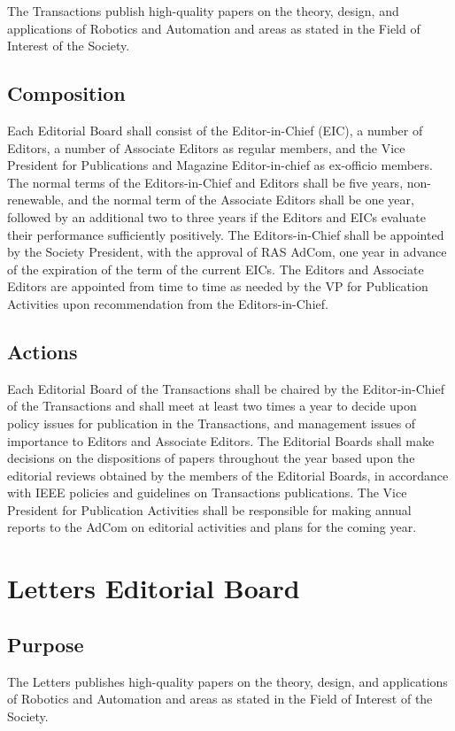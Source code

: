 \documentclass[10pt]{article}
\begin{document}
The Transactions publish high-quality papers on the theory, design, and applications of Robotics and Automation and areas as stated in the Field of Interest of the Society.

\subsection{Composition}
\label{TEB:Composition}
Each Editorial Board shall consist of the Editor-in-Chief (EIC), a number of Editors, a number of Associate Editors as regular members, and the Vice President for Publications and Magazine Editor-in-chief as ex-officio members.  The normal terms of the Editors-in-Chief and Editors shall be five years, non-renewable, and the normal term of the Associate Editors shall be one year, followed by an additional two to three years if the Editors and EICs evaluate their performance sufficiently positively. The Editors-in-Chief shall be appointed by the Society President, with the approval of RAS AdCom, one year in advance of the expiration of the term of the current EICs. The Editors and Associate Editors are appointed from time to time as needed by the VP for Publication Activities upon recommendation from the Editors-in-Chief.

\subsection{Actions}

Each Editorial Board of the Transactions shall be chaired by the Editor-in-Chief of the Transactions and shall meet at least two times a year to decide upon policy issues for publication in the Transactions, and management issues of importance to Editors and Associate Editors.  The Editorial Boards shall make decisions on the dispositions of papers throughout the year based upon the editorial reviews obtained by the members of the Editorial Boards, in accordance with IEEE policies and guidelines on Transactions publications. The Vice President for Publication Activities shall be responsible for making annual reports to the AdCom on editorial activities and plans for the coming year. 


\section{Letters Editorial Board}
\label{LEB}

\subsection{Purpose}
The Letters publishes high-quality papers on the theory, design, and applications of Robotics and Automation and areas as stated in the Field of Interest of the Society.
\end{document}
